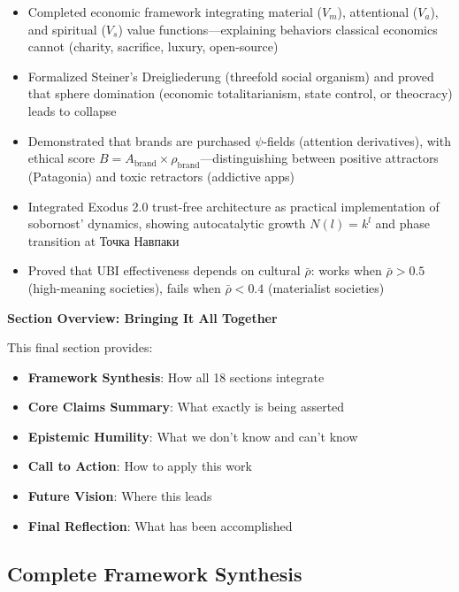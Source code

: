 \documentclass[11pt,a4paper]{article}
\theoremstyle{definition}
\theoremstyle{remark}
\begin{document}
\begin{enumerate}
\begin{protocol}
\begin{itemize}
\item Completed economic framework integrating material (\(V_m\)), attentional (\(V_a\)), and spiritual (\(V_s\)) value functions—explaining behaviors classical economics cannot (charity, sacrifice, luxury, open-source)
\item Formalized Steiner's Dreigliederung (threefold social organism) and proved that sphere domination (economic totalitarianism, state control, or theocracy) leads to collapse
\item Demonstrated that brands are purchased \(\psi\)-fields (attention derivatives), with ethical score \(B = A_{\text{brand}} \times \rho_{\text{brand}}\)—distinguishing between positive attractors (Patagonia) and toxic retractors (addictive apps)
\item Integrated Exodus 2.0 trust-free architecture as practical implementation of sobornost' dynamics, showing autocatalytic growth \(N(l) = k^l\) and phase transition at Точка Навпаки
\item Proved that UBI effectiveness depends on cultural \(\bar{\rho}\): works when \(\bar{\rho} > 0.5\) (high-meaning societies), fails when \(\bar{\rho} < 0.4\) (materialist societies)
\end{itemize}


\begin{mdframed}[backgroundcolor=cyan!5,linewidth=2pt]
\textbf{Section Overview: Bringing It All Together}

This final section provides:

\begin{itemize}[nosep]
    \item \textbf{Framework Synthesis}: How all 18 sections integrate
    \item \textbf{Core Claims Summary}: What exactly is being asserted
    \item \textbf{Epistemic Humility}: What we don't know and can't know
    \item \textbf{Call to Action}: How to apply this work
    \item \textbf{Future Vision}: Where this leads
    \item \textbf{Final Reflection}: What has been accomplished
\end{itemize}
\end{mdframed}

\subsection{Complete Framework Synthesis}


\end{protocol}
\end{enumerate}
\end{document}
